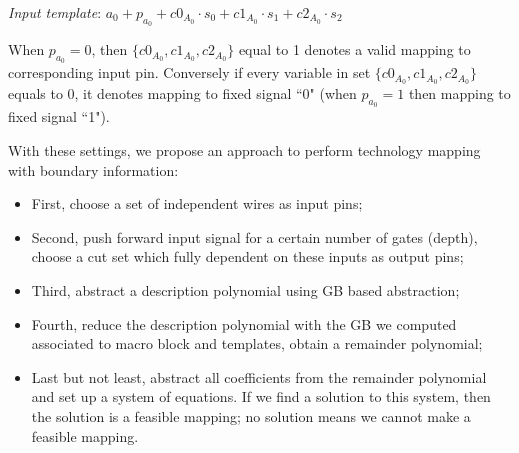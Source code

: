 {\it Input template}: $a_0+p_{a_0}+c0_{A_0}\cdot s_0+c1_{A_0}\cdot s_1+c2_{A_0}\cdot s_2$

When $p_{a_0} = 0$, then $\{c0_{A_0},c1_{A_0},c2_{A_0}\}$ equal to 1 denotes a valid mapping to corresponding input
pin. Conversely if every variable in set $\{c0_{A_0},c1_{A_0},c2_{A_0}\}$ equals to 0, it denotes mapping to fixed signal ``0" (when $p_{a_0} = 1$ then
mapping to fixed signal ``1").

With these settings, we propose an approach to perform technology mapping with boundary information:
\begin{itemize}
\item First, choose a set of independent wires as input pins;

\item Second, push forward input signal for a certain number of gates (depth), choose a cut set
which fully dependent on these inputs as output pins;

\item Third, abstract a description polynomial using GB based abstraction;

\item Fourth, reduce the description polynomial with the GB we computed associated to macro block 
and templates, obtain a remainder polynomial;

\item Last but not least, abstract all coefficients from the remainder polynomial and set up a system of equations.
If we find a solution to this system, then the solution is a feasible mapping; no solution means we cannot make a
feasible mapping.
\end{itemize}
